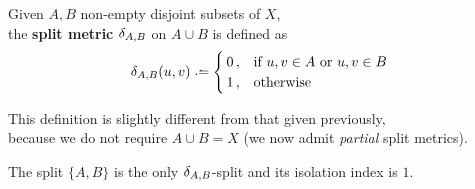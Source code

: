 \documentclass[./main.tex]{subfiles}
\begin{document}
\begin{definition}
    Given $A,B$ non-empty disjoint subsets of $X$, \\
    \bsp the \textbf{split metric} $\delta_{A,B}$ on $A \cup B$ is defined as
    \[ \dAB(u,v) \defeq
        \begin{cases}
        \, 0 \,,    & \text{if}\ u,v \in A\ \text{or}\ u,v \in B \\
        \, 1 \,,    & \text{otherwise}
        \end{cases}
    \nospblw \]
\end{definition}
This definition is slightly different from that given previously, \\
\bsp because we do not require $A \cup B = X$ (we now admit \textit{partial} split metrics).

\begin{proposition}
    The split $\{A,B\}$ is the only $\delta_{A,B}$-split and its isolation index is $1$.
\end{proposition}
\end{document}

